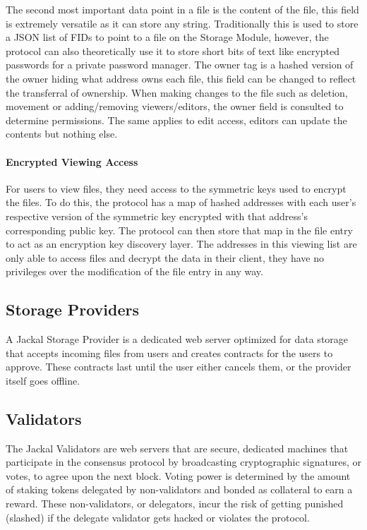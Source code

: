 \documentclass[a4paper]{article}
\begin{document}
\newpage
The second most important data point in a file is the content of the file, this field is extremely versatile as it can store any string. Traditionally this is used to store a JSON list of FIDs to point to a file on the Storage Module, however, the protocol can also theoretically use it to store short bits of text like encrypted passwords for a private password manager. The owner tag is a hashed version of the owner hiding what address owns each file, this field can be changed to reflect the transferral of ownership. When making changes to the file such as deletion, movement or adding/removing viewers/editors, the owner field is consulted to determine permissions. The same applies to edit access, editors can update the contents but nothing else. 

\paragraph{Encrypted Viewing Access}
For users to view files, they need access to the symmetric keys used to encrypt the files. To do this, the protocol has a map of hashed addresses with each user's respective version of the symmetric key encrypted with that address's corresponding public key. The protocol can then store that map in the file entry to act as an encryption key discovery layer. The addresses in this viewing list are only able to access files and decrypt the data in their client, they have no privileges over the modification of the file entry in any way.

\subsection{Storage Providers}
A Jackal Storage Provider is a dedicated web server optimized for data storage that accepts incoming files from users and creates contracts for the users to approve. These contracts last until the user either cancels them, or the provider itself goes offline.

\subsection{Validators}
The Jackal Validators are web servers that are secure, dedicated machines that participate in the consensus protocol by broadcasting cryptographic signatures, or votes, to agree upon the next block. Voting power is determined by the amount of staking tokens delegated by non-validators and bonded as collateral to earn a reward. These non-validators, or delegators, incur the risk of getting punished (slashed) if the delegate validator gets hacked or violates the protocol.
\end{document}
